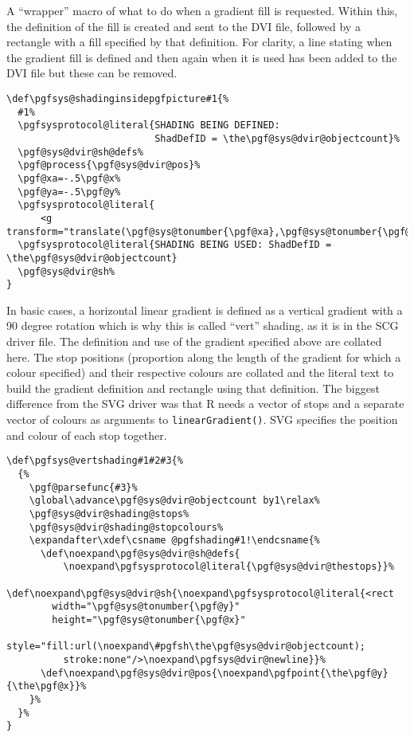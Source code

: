 \documentclass[]{article}
\begin{document}
A ``wrapper'' macro of what to do when a gradient fill is requested.
Within this, the definition of the fill is created and sent to the DVI
file, followed by a rectangle with a fill specified by that definition.
For clarity, a line stating when the gradient fill is defined and then
again when it is used has been added to the DVI file but these can be
removed.

\begin{verbatim}
\def\pgfsys@shadinginsidepgfpicture#1{%
  #1%
  \pgfsysprotocol@literal{SHADING BEING DEFINED: 
                          ShadDefID = \the\pgf@sys@dvir@objectcount}%
  \pgf@sys@dvir@sh@defs% 
  \pgf@process{\pgf@sys@dvir@pos}%
  \pgf@xa=-.5\pgf@x%
  \pgf@ya=-.5\pgf@y%
  \pgfsysprotocol@literal{
      <g transform="translate(\pgf@sys@tonumber{\pgf@xa},\pgf@sys@tonumber{\pgf@ya})">}%
  \pgfsysprotocol@literal{SHADING BEING USED: ShadDefID = \the\pgf@sys@dvir@objectcount}
  \pgf@sys@dvir@sh%
}
\end{verbatim}

In basic cases, a horizontal linear gradient is defined as a vertical
gradient with a 90 degree rotation which is why this is called ``vert''
shading, as it is in the SCG driver file. The definition and use of the
gradient specified above are collated here. The stop positions
(proportion along the length of the gradient for which a colour
specified) and their respective colours are collated and the literal
text to build the gradient definition and rectangle using that
definition. The biggest difference from the SVG driver was that R needs
a vector of stops and a separate vector of colours as arguments to
\texttt{linearGradient()}. SVG specifies the position and colour of each
stop together.

\begin{verbatim}
\def\pgfsys@vertshading#1#2#3{%
  {%
    \pgf@parsefunc{#3}%
    \global\advance\pgf@sys@dvir@objectcount by1\relax%
    \pgf@sys@dvir@shading@stops%
    \pgf@sys@dvir@shading@stopcolours%
    \expandafter\xdef\csname @pgfshading#1!\endcsname{%
      \def\noexpand\pgf@sys@dvir@sh@defs{
          \noexpand\pgfsysprotocol@literal{\pgf@sys@dvir@thestops}}%
      \def\noexpand\pgf@sys@dvir@sh{\noexpand\pgfsysprotocol@literal{<rect
        width="\pgf@sys@tonumber{\pgf@y}"
        height="\pgf@sys@tonumber{\pgf@x}"
        style="fill:url(\noexpand\#pgfsh\the\pgf@sys@dvir@objectcount);
          stroke:none"/>\noexpand\pgfsys@dvir@newline}}%
      \def\noexpand\pgf@sys@dvir@pos{\noexpand\pgfpoint{\the\pgf@y}{\the\pgf@x}}%
    }%
  }%
}
\end{verbatim}
\end{document}
